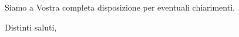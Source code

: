 \documentclass[12pt]{letter} %
\begin{document}
\begin{letter}
\begin{addmargin}[2em]{2em}
		\par Siamo a Vostra completa disposizione per eventuali chiarimenti.
	\end{addmargin}

	\closing{Distinti saluti,}




	\end{letter}
 
\end{document}

